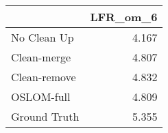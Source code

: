 \begin{tabular}{lr}
\toprule
{} & LFR_om_6 \\
\midrule
No Clean Up  &    4.167 \\
Clean-merge  &    4.807 \\
Clean-remove &    4.832 \\
OSLOM-full   &    4.809 \\
Ground Truth &    5.355 \\
\bottomrule
\end{tabular}
